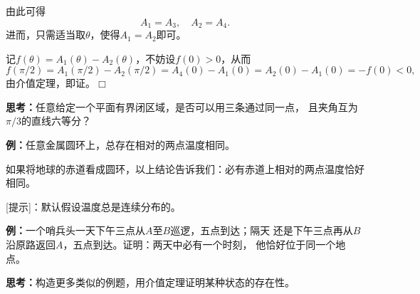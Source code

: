 \begin{center}
\end{center}

由此可得
$$A_1=A_3,\quad A_2=A_4.$$
进而，只需适当取$\theta$，使得$A_1=A_2$即可。

记$f(\theta)=A_1(\theta)-A_2(\theta)$，不妨设$f(0)>0$，从而
$$f(\pi/2)=A_1(\pi/2)-A_2(\pi/2)=A_4(0)-A_1(0)=A_2(0)-A_1(0)=-f(0)<0,$$
由介值定理，即证。\hfill$\Box$

{\bf 思考：}任意给定一个平面有界闭区域，是否可以用三条通过同一点，
且夹角互为$\pi/3$的直线六等分？

{\bf 例：}任意金属圆环上，总存在相对的两点温度相同。

如果将地球的赤道看成圆环，以上结论告诉我们：必有赤道上相对的两点温度恰好相同。

[提示]：默认假设温度总是连续分布的。

{\bf 例：}一个哨兵头一天下午三点从$A$至$B$巡逻，五点到达；隔天
还是下午三点再从$B$沿原路返回$A$，五点到达。证明：两天中必有一个时刻，
他恰好位于同一个地点。

{\bf 思考：}构造更多类似的例题，用介值定理证明某种状态的存在性。

